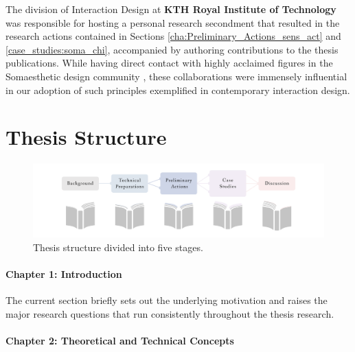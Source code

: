         The division of Interaction Design at \textbf{KTH Royal Institute of Technology} was responsible for hosting a personal research secondment that resulted in the research actions contained in Sections \ref{cha:Preliminary_Actions_sens_act} and \ref{case_studies:soma_chi}, accompanied by authoring contributions to the thesis publications. While having direct contact with highly acclaimed figures in the Somaesthetic design community \cite{hook_designing_2018}, these collaborations were immensely influential in our adoption of such principles exemplified in contemporary interaction design. 

\section{Thesis Structure}
\label{sec:structure}

\begin{figure}[htbp]
	\centering
	\includegraphics[width=1.0\textwidth]{Chapters/Figures/background/Sec1_Thesis_Structure}
	\caption{Thesis structure divided into five stages.}
	\label{fig:thesis_structure}
\vspace*{-20pt}
\end{figure}

\paragraph{Chapter 1: Introduction}
The current section briefly sets out the underlying motivation and raises the major research questions that run consistently throughout the thesis research.

\paragraph{Chapter 2: Theoretical and Technical Concepts}

